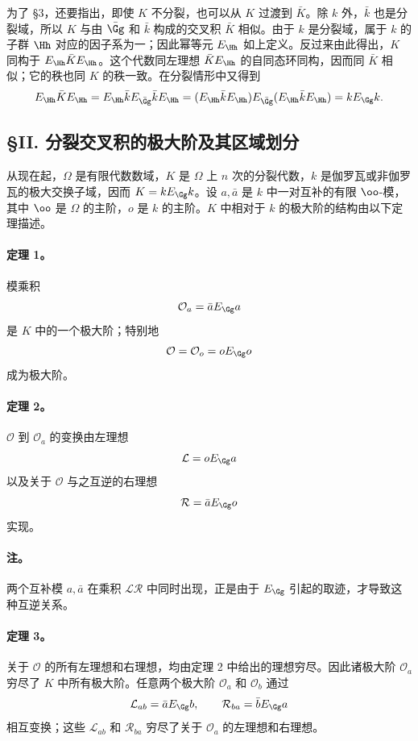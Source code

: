 为了 §3，还要指出，即使 \(K\) 不分裂，也可以从 \(K\) 过渡到 \(\bar K\)。除 \(k\) 外，\(\bar k\) 也是分裂域，所以 \(K\) 与由 \(\bar\Gg\) 和 \(\bar k\) 构成的交叉积 \(\bar K\) 相似。由于 \(k\) 是分裂域，属于 \(k\) 的子群 \(\Hh\) 对应的因子系为一；因此幂等元 \(E_\Hh\) 如上定义。反过来由此得出，\(K\) 同构于 \(E_\Hh\bar K E_\Hh\)。这个代数同左理想 \(\bar K E_\Hh\) 的自同态环同构，因而同 \(\bar K\) 相似；它的秩也同 \(K\) 的秩一致。在分裂情形中又得到
\[
        E_\Hh\bar K E_\Hh
        =E_\Hh\bar kE_{\bar\Gg}\bar kE_\Hh
        =(E_\Hh\bar kE_\Hh)E_{\bar\Gg}(E_\Hh\bar kE_\Hh)
        =kE_\Gg k .
\]

\subsection*{§II. 分裂交叉积的极大阶及其区域划分}

从现在起，\(\Omega\) 是有限代数数域，\(K\) 是 \(\Omega\) 上 \(n\) 次的分裂代数，\(k\) 是伽罗瓦或非伽罗瓦的极大交换子域，因而 \(K=kE_\Gg k\)。设 \(a,\bar a\) 是 \(k\) 中一对互补的有限 \(\oo\)-模，其中 \(\oo\) 是 \(\Omega\) 的主阶，\(o\) 是 \(k\) 的主阶。\(K\) 中相对于 \(k\) 的极大阶的结构由以下定理描述。

\paragraph{定理 1。}
模乘积
\[
        \mathcal O_a=\bar a E_\Gg a
\]
是 \(K\) 中的一个极大阶；特别地
\[
        \mathcal O=\mathcal O_o=oE_\Gg o
\]
成为极大阶。

\paragraph{定理 2。}
\(\mathcal O\) 到 \(\mathcal O_a\) 的变换由左理想
\[
        \mathcal L=oE_\Gg a
\]
以及关于 \(\mathcal O\) 与之互逆的右理想
\[
        \mathcal R=\bar a E_\Gg o
\]
实现。

\paragraph{注。}
两个互补模 \(a,\bar a\) 在乘积 \(\mathcal L\mathcal R\) 中同时出现，正是由于 \(E_\Gg\) 引起的取迹，才导致这种互逆关系。

\paragraph{定理 3。}
关于 \(\mathcal O\) 的所有左理想和右理想，均由定理 2 中给出的理想穷尽。因此诸极大阶 \(\mathcal O_a\) 穷尽了 \(K\) 中所有极大阶。任意两个极大阶 \(\mathcal O_a\) 和 \(\mathcal O_b\) 通过
\[
        \mathcal L_{ab}=\bar aE_\Gg b,
        \qquad
        \mathcal R_{ba}=\bar bE_\Gg a
\]
相互变换；这些 \(\mathcal L_{ab}\) 和 \(\mathcal R_{ba}\) 穷尽了关于 \(\mathcal O_a\) 的左理想和右理想。

